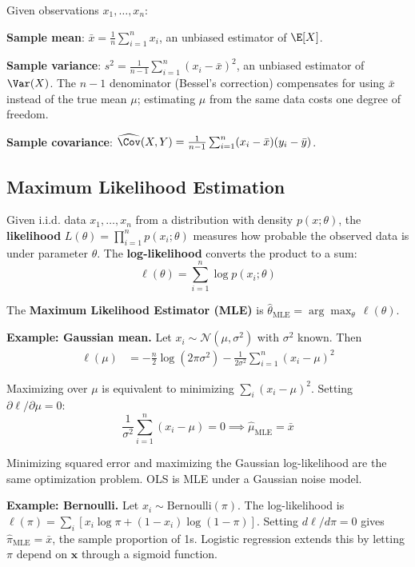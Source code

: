 \documentclass[main.tex]{subfiles}
\begin{document}
Given observations $x_1, \ldots, x_n$:

\textbf{Sample mean}: $\bar{x} = \frac{1}{n}\sum_{i=1}^{n} x_i$, an unbiased estimator of $\E[X]$.

\textbf{Sample variance}: $s^2 = \frac{1}{n-1}\sum_{i=1}^{n}(x_i - \bar{x})^2$, an unbiased estimator of $\Var(X)$. The $n - 1$ denominator (Bessel's correction) compensates for using $\bar{x}$ instead of the true mean $\mu$; estimating $\mu$ from the same data costs one degree of freedom.

\textbf{Sample covariance}: $\widehat{\Cov}(X, Y) = \frac{1}{n-1}\sum_{i=1}^{n}(x_i - \bar{x})(y_i - \bar{y})$.

\subsection{Maximum Likelihood Estimation}

Given i.i.d. data $x_1, \ldots, x_n$ from a distribution with density $p(x; \theta)$, the \textbf{likelihood} $L(\theta) = \prod_{i=1}^{n} p(x_i; \theta)$ measures how probable the observed data is under parameter $\theta$. The \textbf{log-likelihood} converts the product to a sum:
$$\ell(\theta) = \sum_{i=1}^{n} \log p(x_i; \theta)$$

The \textbf{Maximum Likelihood Estimator (MLE)} is $\hat{\theta}_{\text{MLE}} = \arg\max_\theta\,\ell(\theta)$.

\textbf{Example: Gaussian mean.} Let $x_i \sim \mathcal{N}(\mu, \sigma^2)$ with $\sigma^2$ known. Then
\begin{align}
\ell(\mu) &= -\frac{n}{2}\log(2\pi\sigma^2) - \frac{1}{2\sigma^2}\sum_{i=1}^{n}(x_i - \mu)^2
\end{align}

Maximizing over $\mu$ is equivalent to minimizing $\sum_i(x_i - \mu)^2$. Setting $\partial\ell/\partial\mu = 0$:
$$\frac{1}{\sigma^2}\sum_{i=1}^{n}(x_i - \mu) = 0 \implies \hat{\mu}_{\text{MLE}} = \bar{x}$$

Minimizing squared error and maximizing the Gaussian log-likelihood are the same optimization problem. OLS is MLE under a Gaussian noise model.

\textbf{Example: Bernoulli.} Let $x_i \sim \text{Bernoulli}(\pi)$. The log-likelihood is $\ell(\pi) = \sum_i [x_i\log\pi + (1 - x_i)\log(1 - \pi)]$. Setting $d\ell/d\pi = 0$ gives $\hat{\pi}_{\text{MLE}} = \bar{x}$, the sample proportion of 1s. Logistic regression extends this by letting $\pi$ depend on $\mathbf{x}$ through a sigmoid function.
\end{document}
